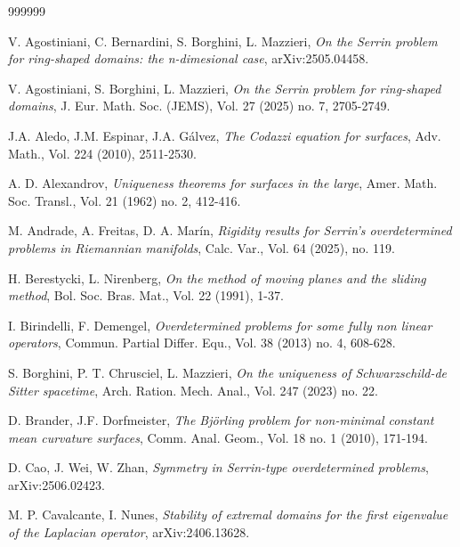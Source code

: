 \documentclass[11pt]{article}
\numberwithin{equation} {section}
\begin{document}
\begin{thebibliography}{999999}
	\footnotesize
	
	 V. Agostiniani, C. Bernardini, S. Borghini, L. Mazzieri, \emph{On the Serrin problem for ring-shaped domains: the n-dimesional case}, arXiv:2505.04458.
	
	 V. Agostiniani, S. Borghini, L. Mazzieri, \emph{On the Serrin problem for ring-shaped domains}, J. Eur. Math. Soc. (JEMS), Vol. 27 (2025) no. 7, 2705-2749.
	
	 J.A. Aledo, J.M. Espinar, J.A. Gálvez, \emph{The Codazzi equation for surfaces}, Adv. Math., Vol. 224 (2010), 2511-2530.
	
	 A. D. Alexandrov, \emph{Uniqueness theorems for surfaces in the large}, Amer. Math. Soc. Transl., Vol. 21 (1962) no. 2, 412-416.
	
	 M. Andrade, A. Freitas, D. A. Marín, \emph{Rigidity results for Serrin's overdetermined problems in Riemannian manifolds}, Calc. Var., Vol. 64 (2025), no. 119.
	
	
	 H. Berestycki, L. Nirenberg, \emph{On the method of moving planes and the sliding method}, Bol. Soc. Bras. Mat., Vol. 22 (1991), 1-37.
	
	  I. Birindelli, F. Demengel, \emph{Overdetermined problems for some fully non linear operators}, Commun. Partial Differ. Equ., Vol. 38 (2013) no. 4, 608-628.
	
	 S. Borghini, P. T. Chrusciel, L. Mazzieri, {\it On the uniqueness of Schwarzschild-de Sitter spacetime}, Arch. Ration. Mech. Anal., Vol. 247 (2023) no. 22.
	
	 D. Brander, J.F. Dorfmeister, \emph{The Björling problem for non-minimal constant mean curvature surfaces}, Comm. Anal. Geom., Vol. 18 no. 1 (2010), 171-194.
	
	 D. Cao, J. Wei, W. Zhan, \emph{Symmetry in Serrin-type overdetermined problems}, arXiv:2506.02423.
	
	 M. P. Cavalcante, I. Nunes, \emph{Stability of extremal domains for the first eigenvalue of the Laplacian operator}, arXiv:2406.13628.
	
	

\end{thebibliography}
\end{document}
